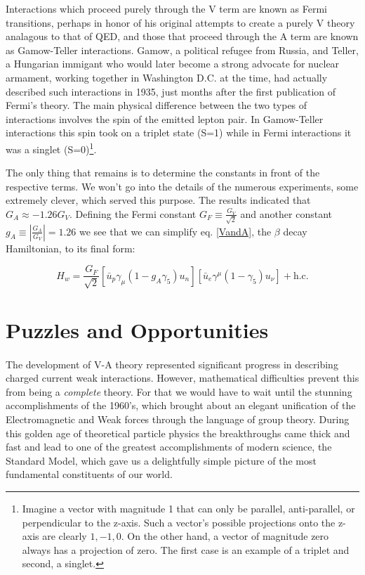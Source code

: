\documentclass[a4paper,12pt]{book}
\begin{document}
Interactions which proceed purely through the V term are known as Fermi transitions, perhaps in honor of his original attempts to create a purely V theory analagous to that of QED, and those that proceed through the A term are known as Gamow-Teller interactions. Gamow, a political refugee from Russia, and Teller, a Hungarian immigant who would later become a strong advocate for nuclear armament, working together in Washington D.C. at the time, had actually described such interactions in 1935, just months after the first publication of Fermi's theory. The main physical difference between the two types of interactions involves the spin of the emitted lepton pair. In Gamow-Teller interactions this spin took on a triplet state (S=1) while in Fermi interactions it was a singlet (S=0)\footnote{Imagine a vector with magnitude 1 that can only be parallel, anti-parallel, or perpendicular to the z-axis. Such a vector's possible projections onto the z-axis are clearly $1, -1, 0$. On the other hand, a vector of magnitude zero always has a projection of zero. The first case is an example of a triplet and second, a singlet.}.

The only thing that remains is to determine the constants in front of the respective terms. We won't go into the details of the numerous experiments, some extremely clever, which served this purpose. The results indicated that $G_{A}\approx -1.26G_{V}$. Defining the Fermi constant $G_{F}\equiv \frac{G_{V}}{\sqrt{2}}$ and another constant $g_{A}\equiv \left|\frac{G_{A}}{G_{V}}\right|=1.26$ we see that we can simplify eq. \ref{VandA}, the $\beta$ decay Hamiltonian, to its final form:

\begin{equation}\label{VminA}
\boxed{
H_{w}=\frac{G_{F}}{\sqrt{2}}\left[\bar{u}_{p}\gamma_{\mu}\left(1-g_{A}\gamma_{5}\right)u_{n}\right]\left[\bar{u}_{e}\gamma^{\mu}\left(1-\gamma_{5}\right)u_{\nu}\right]+\text{h.c.}
} 
\end{equation}

\section{Puzzles and Opportunities}

\paragraph{}The development of V-A theory represented significant progress in describing charged current weak interactions. However, mathematical difficulties prevent this from being a \emph{complete} theory. For that we would have to wait until the stunning accomplishments of the 1960's, which brought about an elegant unification of the Electromagnetic and Weak forces through the language of group theory. During this golden age of theoretical particle physics the breakthroughs came thick and fast and lead to one of the greatest accomplishments of modern science, the Standard Model, which gave us a delightfully simple picture of the most fundamental constituents of our world.
\end{document}
